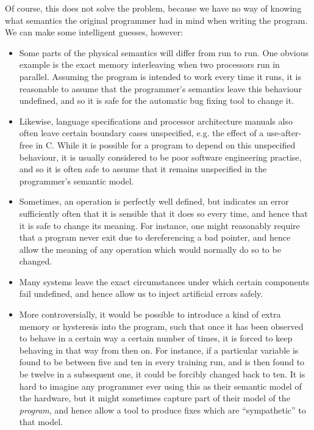 Of course, this does not solve the problem, because we have no way of
knowing what semantics the original programmer had in mind when
writing the program.  We can make some intelligent guesses, however:

\begin{itemize}
\item Some parts of the physical semantics will differ from run to
  run.  One obvious example is the exact memory interleaving when two
  processors run in parallel.  Assuming the program is intended to
  work every time it runs, it is reasonable to assume that the
  programmer's semantics leave this behaviour undefined, and so it is
  safe for the automatic bug fixing tool to change it.

\item Likewise, language specifications and processor architecture
  manuals also often leave certain boundary cases unspecified,
  e.g. the effect of a use-after-free in C\cite{Kernighan1988}.  While
  it is possible for a program to depend on this unspecified
  behaviour, it is usually considered to be poor software engineering
  practise\cite{CWE758}, and so it is often safe to assume that it
  remains unspecified in the programmer's semantic model.

\item Sometimes, an operation is perfectly well defined, but indicates
  an error sufficiently often that it is sensible that it does so
  every time, and hence that it is safe to change its meaning.  For
  instance, one might reasonably require that a program never exit due
  to dereferencing a bad pointer, and hence allow the meaning of any
  operation which would normally do so to be changed.

\item Many systems leave the exact circumstances under which certain
  components fail undefined, and hence allow us to inject artificial
  errors safely.

\item More controversially, it would be possible to introduce a kind
  of extra memory or hysteresis into the program, such that once it
  has been observed to behave in a certain way a certain number of
  times, it is forced to keep behaving in that way from then on.  For
  instance, if a particular variable is found to be between five and
  ten in every training run, and is then found to be twelve in a
  subsequent one, it could be forcibly changed back to ten.  It is
  hard to imagine any programmer ever using this as their semantic
  model of the hardware, but it might sometimes capture part of their
  model of the \emph{program}, and hence allow a tool to produce fixes
  which are ``sympathetic'' to that model.
\end{itemize}

